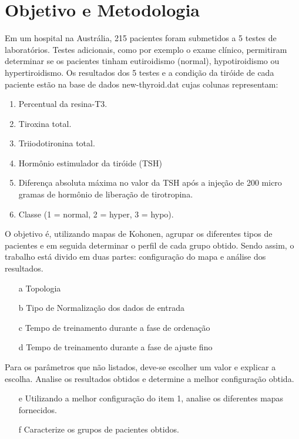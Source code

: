 \documentclass[journal, a4paper]{IEEEtran}
\begin{document}
\section{Objetivo e Metodologia}


Em um hospital na Austrália, 215 pacientes foram submetidos a 5 testes de laboratórios. Testes adicionais, como por exemplo o exame clínico, permitiram determinar se os pacientes tinham eutiroidismo (normal), hypotiroidismo ou hypertiroidismo. Os resultados dos 5 testes e a condição da tiróide de cada paciente estão na base de dados new-thyroid.dat cujas colunas representam:

\begin{enumerate}
\item Percentual da resina-T3.
\item Tiroxina total.
\item Triiodotironina total.
\item Hormônio estimulador da tiróide (TSH)
\item  Diferença absoluta máxima no valor da TSH após a injeção de 200 micro gramas de hormônio de liberação de tirotropina.  
\item Classe (1 = normal, 2 = hyper, 3 = hypo).
\end{enumerate}


O objetivo é, utilizando mapas de Kohonen, agrupar os diferentes tipos de pacientes e em seguida determinar o perfil de cada grupo obtido. Sendo assim, o trabalho está divido em duas partes: configuração do mapa e análise dos resultados.

\begin{itemize}[Configuração do mapa:]
\item[a] Topologia
\item[b] Tipo de Normalização dos dados de entrada
\item[c] Tempo de treinamento durante a fase de ordenação
\item[d] Tempo de treinamento durante a fase de ajuste fino
\end{itemize}

Para os parâmetros que não listados, deve-se escolher um valor e explicar a escolha. Analise os resultados obtidos e determine a melhor configuração obtida.

\begin{itemize}[Análise dos resultados:]
\item[e] Utilizando a melhor configuração do item 1, analise os diferentes mapas fornecidos.
\item[f] Caracterize os grupos de pacientes obtidos.
\end{itemize}
\end{document}
